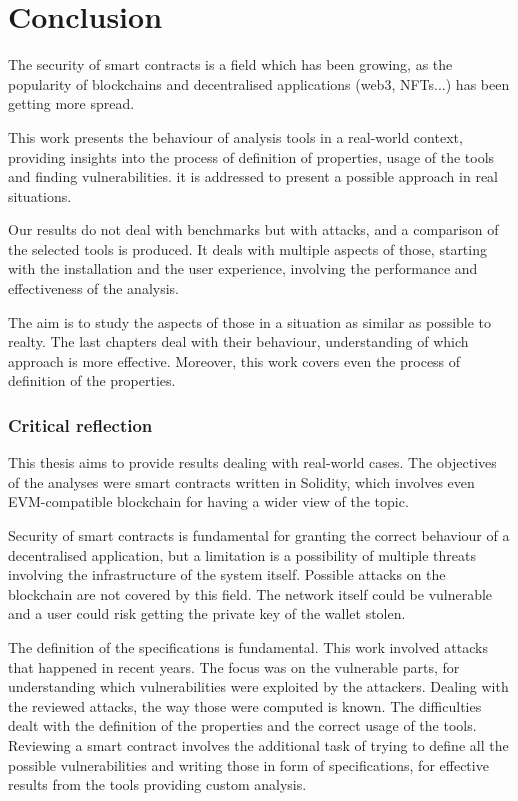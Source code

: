 
\chapter{Conclusion}
\label{ch:Conclusion}
The security of smart contracts is a field which has been growing, 
as the popularity of blockchains and decentralised applications (web3, NFTs...) has been getting more spread.

This work presents the behaviour of analysis tools in a real-world context, 
providing insights into the process of definition of properties, usage of the tools and finding vulnerabilities.
it is addressed to present a possible approach in real situations.

Our results do not deal with benchmarks but with attacks, and a comparison of the selected tools is produced.
It deals with multiple aspects of those, starting with the installation and the user experience, involving the performance and effectiveness of the analysis.

The aim is to study the aspects of those in a situation as 
similar as possible to realty. 
The last chapters deal with their behaviour, 
understanding of which approach is more effective. 
Moreover, this work covers even the process of definition of the properties.

\subsection{Critical reﬂection}
This thesis aims to provide results dealing with real-world cases. 
The objectives of the analyses were smart contracts written in Solidity, which involves even EVM-compatible blockchain for having a wider view of the topic.

Security of smart contracts is fundamental for granting the correct behaviour of a decentralised application, but a limitation is a possibility 
of multiple threats involving the infrastructure of the system itself.
Possible attacks on the blockchain are not covered by this field. 
The network itself could be vulnerable and a user could risk getting the private key of the wallet stolen. 

The definition of the specifications is fundamental.
This work involved attacks that happened in recent years. 
The focus was on the vulnerable parts, for understanding which vulnerabilities were exploited by the attackers.
Dealing with the reviewed attacks, the way those were computed is known. 
The difficulties dealt with the definition of the properties and the correct usage of the tools. 
Reviewing a smart contract involves the additional task of trying to define all the possible vulnerabilities and writing those in form of specifications, 
for effective results from the tools providing custom analysis.

